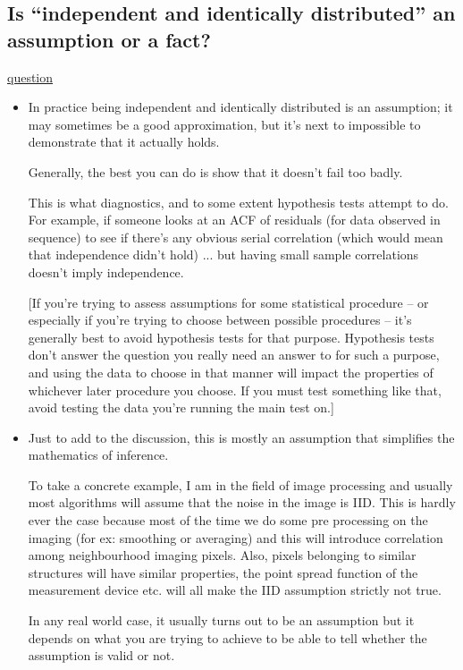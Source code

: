 \documentclass[11pt,a4paper]{article}
\theoremstyle{definition}
\begin{document}
	\subsection{Is ``independent and identically distributed'' an assumption or a fact?}
	\href{https://stats.stackexchange.com/questions/82096/is-independent-and-identically-distributed-an-assumption-or-a-fact}{question}
	\begin{itemize}
		\item In practice being independent and identically distributed is an assumption; it may sometimes be a good approximation, but it's next to impossible to demonstrate that it actually holds.

	Generally, the best you can do is show that it doesn't fail too badly.

	This is what diagnostics, and to some extent hypothesis tests attempt to do. For example, if someone looks at an ACF of residuals (for data observed in sequence) to see if there's any obvious serial correlation (which would mean that independence didn't hold) ... but having small sample correlations doesn't imply independence.

	[If you're trying to assess assumptions for some statistical procedure -- or especially if you're trying to choose between possible procedures -- it's generally best to avoid hypothesis tests for that purpose. Hypothesis tests don't answer the question you really need an answer to for such a purpose, and using the data to choose in that manner will impact the properties of whichever later procedure you choose. If you must test something like that, avoid testing the data you're running the main test on.]
		\item Just to add to the discussion, this is mostly an assumption that simplifies the mathematics of inference.

To take a concrete example, I am in the field of image processing and usually most algorithms will assume that the noise in the image is IID. This is hardly ever the case because most of the time we do some pre processing on the imaging (for ex: smoothing or averaging) and this will introduce correlation among neighbourhood imaging pixels. Also, pixels belonging to similar structures will have similar properties, the point spread function of the measurement device etc. will all make the IID assumption strictly not true.

In any real world case, it usually turns out to be an assumption but it depends on what you are trying to achieve to be able to tell whether the assumption is valid or not.
	\end{itemize}
\end{document}
